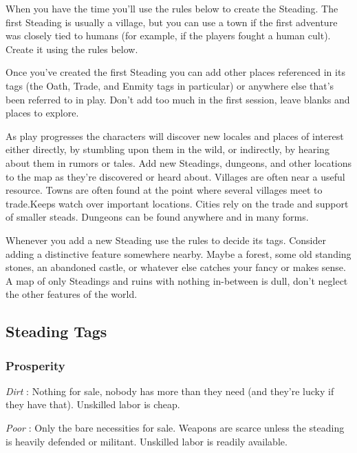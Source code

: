  

When you have the time you'll use the rules below to create the Steading. The first Steading is usually a village, but you can use a town if the first adventure was closely tied to humans (for example, if the players fought a human cult). Create it using the rules below.

 

Once you've created the first Steading you can add other places referenced in its tags (the Oath, Trade, and Enmity tags in particular) or anywhere else that's been referred to in play. Don't add too much in the first session, leave blanks and places to explore.

 

As play progresses the characters will discover new locales and places of interest either directly, by stumbling upon them in the wild, or indirectly, by hearing about them in rumors or tales. Add new Steadings, dungeons, and other locations to the map as they're discovered or heard about. Villages are often near a useful resource. Towns are often found at the point where several villages meet to trade.Keeps watch over important locations. Cities rely on the trade and support of smaller steads. Dungeons can be found anywhere and in many forms.

 

Whenever you add a new Steading use the rules to decide its tags. Consider adding a distinctive feature somewhere nearby. Maybe a forest, some old standing stones, an abandoned castle, or whatever else catches your fancy or makes sense. A map of only Steadings and ruins with nothing in-between is dull, don't neglect the other features of the world.

 
\subsection{Steading Tags}   
 
\subsubsection{Prosperity}   
 

{\em Dirt} : Nothing for sale, nobody has more than they need (and they're lucky if they have that). Unskilled labor is cheap.

 

{\em Poor} : Only the bare necessities for sale. Weapons are scarce unless the steading is heavily defended or militant. Unskilled labor is readily available.

